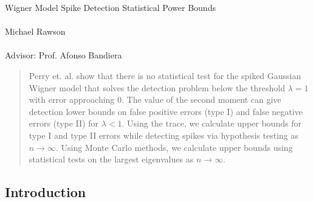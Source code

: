 \documentclass{article}
\begin{document}
\begin{center}
\Large
Wigner Model Spike Detection Statistical Power Bounds \\
\normalsize
~\\
Michael Rawson\\
~\\
Advisor: Prof. Afonso Bandiera
\end{center}

\begin{abstract}

Perry et. al. \cite{perry} show that there is no statistical test for the spiked Gaussian Wigner model that solves the detection problem below the threshold $\lambda = 1$ with error approaching 0. The value of the second moment can give detection lower bounds on false positive errors (type I) and false negative errors (type II) for $\lambda < 1$. Using the trace, we calculate upper bounds for type I and type II errors while detecting spikes via hypothesis testing as $n \rightarrow \infty$.  Using Monte Carlo methods, we calculate upper bounds using statistical tests on the largest eigenvalues as $n \rightarrow \infty$.

\end{abstract}

\subsection*{Introduction}
\end{document}
